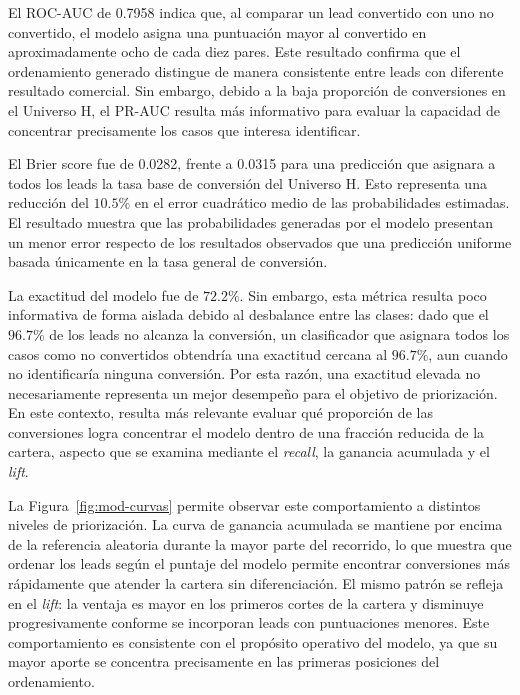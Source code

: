 El ROC-AUC de 0.7958 indica que, al comparar un lead convertido con uno no convertido, el modelo asigna una puntuación mayor al convertido en aproximadamente ocho de cada diez pares. Este resultado confirma que el ordenamiento generado distingue de manera consistente entre leads con diferente resultado comercial. Sin embargo, debido a la baja proporción de conversiones en el Universo H, el PR-AUC resulta más informativo para evaluar la capacidad de concentrar precisamente los casos que interesa identificar.

El Brier score fue de 0.0282, frente a 0.0315 para una predicción que asignara a todos los leads la tasa base de conversión del Universo H. Esto representa una reducción del $10.5\%$ en el error cuadrático medio de las probabilidades estimadas. El resultado muestra que las probabilidades generadas por el modelo presentan un menor error respecto de los resultados observados que una predicción uniforme basada únicamente en la tasa general de conversión.

La exactitud del modelo fue de $72.2\%$. Sin embargo, esta métrica resulta poco informativa de forma aislada debido al desbalance entre las clases: dado que el $96.7\%$ de los leads no alcanza la conversión, un clasificador que asignara todos los casos como no convertidos obtendría una exactitud cercana al $96.7\%$, aun cuando no identificaría ninguna conversión. Por esta razón, una exactitud elevada no necesariamente representa un mejor desempeño para el objetivo de priorización. En este contexto, resulta más relevante evaluar qué proporción de las conversiones logra concentrar el modelo dentro de una fracción reducida de la cartera, aspecto que se examina mediante el \textit{recall}, la ganancia acumulada y el \textit{lift}.

La Figura~\ref{fig:mod-curvas} permite observar este comportamiento a distintos niveles de priorización. La curva de ganancia acumulada se mantiene por encima de la referencia aleatoria durante la mayor parte del recorrido, lo que muestra que ordenar los leads según el puntaje del modelo permite encontrar conversiones más rápidamente que atender la cartera sin diferenciación. El mismo patrón se refleja en el \textit{lift}: la ventaja es mayor en los primeros cortes de la cartera y disminuye progresivamente conforme se incorporan leads con puntuaciones menores. Este comportamiento es consistente con el propósito operativo del modelo, ya que su mayor aporte se concentra precisamente en las primeras posiciones del ordenamiento.


